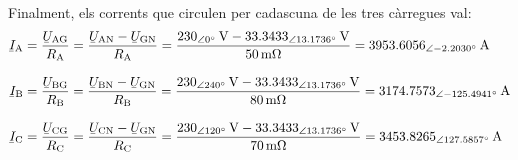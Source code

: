\begin{exemple}
    Finalment, els corrents que circulen per cadascuna de les tres càrregues val:
    \begin{align*}
    \cmplx{I}\ped{A} &= \frac{\cmplx{U}\ped{AG}}{R\ped{A}} = \frac{\cmplx{U}\ped{AN} - \cmplx{U}\ped{GN}}{R\ped{A}} = \frac{\SIpd{230}{0}{V}-\SIpd{33,3433}{13,1736}{V}}{\SI{50}{m\ohm}}
    = \SIpd{3953,6056}{-2,2030}{A}\\[2ex]
    \cmplx{I}\ped{B} &= \frac{\cmplx{U}\ped{BG}}{R\ped{B}} = \frac{\cmplx{U}\ped{BN} - \cmplx{U}\ped{GN}}{R\ped{B}} = \frac{\SIpd{230}{240}{V}-\SIpd{33,3433}{13,1736}{V}}{\SI{80}{m\ohm}}
    = \SIpd{3174,7573}{-125,4941}{A}\\[2ex]
    \cmplx{I}\ped{C} &= \frac{\cmplx{U}\ped{CG}}{R\ped{C}} = \frac{\cmplx{U}\ped{CN} - \cmplx{U}\ped{GN}}{R\ped{C}} = \frac{\SIpd{230}{120}{V}-\SIpd{33,3433}{13,1736}{V}}{\SI{70}{m\ohm}}
    = \SIpd{3453,8265}{127,5857}{A}
    \end{align*}
\end{exemple}

